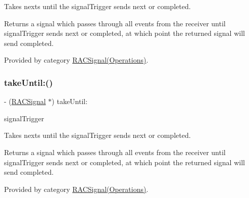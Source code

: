 Takes {\ttfamily next}s until the {\ttfamily signal\+Trigger} sends {\ttfamily next} or {\ttfamily completed}.

Returns a signal which passes through all events from the receiver until {\ttfamily signal\+Trigger} sends {\ttfamily next} or {\ttfamily completed}, at which point the returned signal will send {\ttfamily completed}. 

Provided by category \mbox{\hyperlink{category_r_a_c_signal_07_operations_08_afb214e9e69dc34880b306c118b8e56d4}{R\+A\+C\+Signal(\+Operations)}}.

\mbox{\label{interface_r_a_c_signal_afb214e9e69dc34880b306c118b8e56d4}} 
\subsubsection{\texorpdfstring{take\+Until\+:()}{takeUntil:()}\hspace{0.1cm}{\footnotesize\ttfamily [2/3]}}
{\footnotesize\ttfamily -\/ (\mbox{\hyperlink{interface_r_a_c_signal}{R\+A\+C\+Signal}} $\ast$) take\+Until\+: \begin{DoxyParamCaption}\item[{(\mbox{\hyperlink{interface_r_a_c_signal}{R\+A\+C\+Signal}} $\ast$)}]{signal\+Trigger }\end{DoxyParamCaption}}

Takes {\ttfamily next}s until the {\ttfamily signal\+Trigger} sends {\ttfamily next} or {\ttfamily completed}.

Returns a signal which passes through all events from the receiver until {\ttfamily signal\+Trigger} sends {\ttfamily next} or {\ttfamily completed}, at which point the returned signal will send {\ttfamily completed}. 

Provided by category \mbox{\hyperlink{category_r_a_c_signal_07_operations_08_afb214e9e69dc34880b306c118b8e56d4}{R\+A\+C\+Signal(\+Operations)}}.

